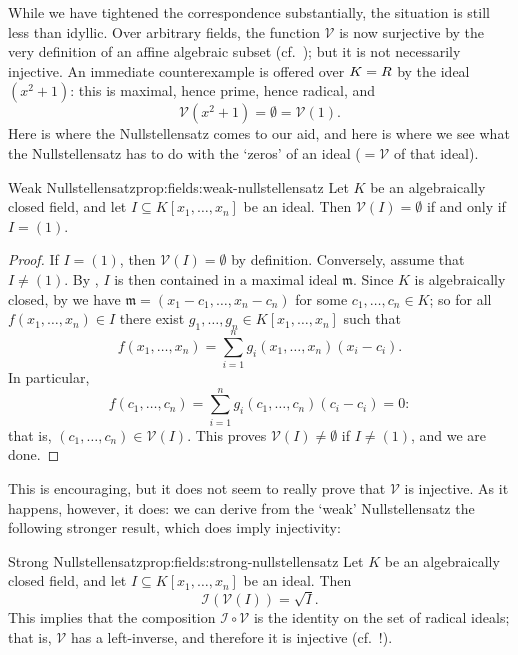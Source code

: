 While we have tightened the correspondence substantially, the
situation is still less than idyllic. Over arbitrary fields, the
function $\mathcal{V}$ is now surjective by the very definition of an
affine algebraic subset (cf.\
); but it is not
necessarily injective. An immediate counterexample is offered over
$K = R$ by the ideal $(x^2 + 1)$: this is maximal, hence prime, hence
radical, and
\[
  \mathcal{V}(x^2 + 1) = \emptyset = \mathcal{V}(1).
\]
Here is where the Nullstellensatz comes to our aid, and here is where
we see what the Nullstellensatz has to do with the `zeros' of an ideal
($ = \mathcal{V}$ of that ideal).
\begin{prop}{Weak Nullstellensatz}{prop:fields:weak-nullstellensatz}
  Let $K$ be an algebraically closed field, and let
  $I \subseteq K[x_1, \dots, x_n]$ be an ideal. Then
  $\mathcal{V}(I) = \emptyset$ if and only if $I = (1)$.
\end{prop}
\begin{proof}
  If $I = (1)$, then $\mathcal{V}(I) = \emptyset$ by definition.
  Conversely, assume that $I \neq (1)$. By , $I$
  is then contained in a maximal ideal $\mathfrak{m}$. Since $K$ is
  algebraically closed, by  we have
  $\mathfrak{m} = (x_1 - c_1, \dots, x_n - c_n)$ for some
  $c_1, \dots, c_n \in K$; so for all $f(x_1, \dots, x_n) \in I$ there
  exist $g_1, \dots, g_n \in K[x_1, \dots, x_n]$ such that
  \[
    f(x_1, \dots, x_n) = \sum_{i=1}^{n} g_i(x_1, \dots, x_n)(x_i -
    c_i).
  \]
  In particular,
  \[
    f(c_1, \dots, c_n) = \sum_{i=1}^{n} g_i(c_1, \dots, c_n)(c_i -
    c_i) = 0:
  \]
  that is, $(c_1, \dots, c_n) \in \mathcal{V}(I)$. This proves
  $\mathcal{V}(I) \neq \emptyset$ if $I \neq (1)$, and we are done.
\end{proof}
This is encouraging, but it does not seem to really prove that
$\mathcal{V}$ is injective. As it happens, however, it does: we can
derive from the `weak' Nullstellensatz the following stronger result,
which does imply injectivity:
\begin{prop}{Strong Nullstellensatz}{prop:fields:strong-nullstellensatz}
  Let $K$ be an algebraically closed field, and let
  $I \subseteq K[x_1, \dots, x_n]$ be an ideal. Then
  \[
    \mathcal{I}(\mathcal{V}(I)) = \sqrt{I}.
  \]
  This implies that the composition $\mathcal{I} \circ \mathcal{V}$ is
  the identity on the set of radical ideals; that is, $\mathcal{V}$
  has a left-inverse, and therefore it is injective (cf.\
  !).
\end{prop}

